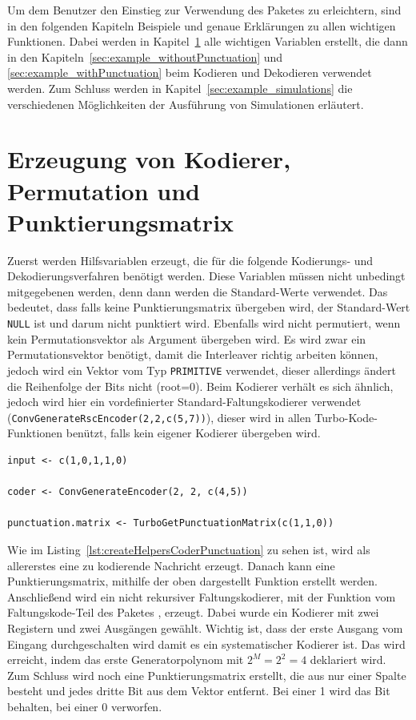 Um dem Benutzer den Einstieg zur Verwendung des Paketes zu erleichtern, sind in den folgenden Kapiteln Beispiele und genaue Erklärungen zu allen wichtigen Funktionen. Dabei werden in Kapitel~\ref{sec:example_createHelpers} alle wichtigen Variablen erstellt, die dann in den Kapiteln~\ref{sec:example_withoutPunctuation} und \ref{sec:example_withPunctuation} beim Kodieren und Dekodieren verwendet werden. Zum Schluss werden in Kapitel~\ref{sec:example_simulations} die verschiedenen Möglichkeiten der Ausführung von Simulationen erläutert.

\section{Erzeugung von Kodierer, Permutation und Punktierungsmatrix}
\label{sec:example_createHelpers}
Zuerst werden Hilfsvariablen erzeugt, die für die folgende Kodierungs- und Dekodierungsverfahren benötigt werden. Diese Variablen müssen nicht unbedingt mitgegebenen werden, denn dann werden die Standard-Werte verwendet. Das bedeutet, dass falls keine Punktierungsmatrix übergeben wird, der Standard-Wert \texttt{NULL} ist und darum nicht punktiert wird. Ebenfalls wird nicht permutiert, wenn kein Permutationsvektor als Argument übergeben wird. Es wird zwar ein Permutationsvektor benötigt, damit die Interleaver richtig arbeiten können, jedoch wird ein Vektor vom Typ \texttt{PRIMITIVE} verwendet, dieser allerdings ändert die Reihenfolge der Bits nicht (root=0). Beim Kodierer verhält es sich ähnlich, jedoch wird hier ein vordefinierter Standard-Faltungskodierer verwendet (\texttt{ConvGenerateRscEncoder(2,2,c(5,7))}), dieser wird in allen Turbo-Kode-Funktionen benützt, falls kein eigener Kodierer übergeben wird.

\begin{lstlisting}[caption=Erzeugung von Kodierer und Punktierungsmatrix, label={lst:createHelpersCoderPunctuation}, float=!th]
input <- c(1,0,1,1,0)

coder <- ConvGenerateEncoder(2, 2, c(4,5))

punctuation.matrix <- TurboGetPunctuationMatrix(c(1,1,0))
\end{lstlisting}

Wie im Listing~\ref{lst:createHelpersCoderPunctuation} zu sehen ist, wird als allererstes eine zu kodierende Nachricht erzeugt. Danach kann eine Punktierungsmatrix, mithilfe der oben dargestellt Funktion erstellt werden. Anschließend wird ein nicht rekursiver Faltungskodierer, mit der Funktion vom Faltungskode-Teil des Paketes \cite{nocker}, erzeugt. Dabei wurde ein Kodierer mit zwei Registern und zwei Ausgängen gewählt. Wichtig ist, dass der erste Ausgang vom Eingang durchgeschalten wird damit es ein systematischer Kodierer ist. Das wird erreicht, indem das erste Generatorpolynom mit $2^M = 2^2 = 4$ deklariert wird. Zum Schluss wird noch eine Punktierungsmatrix erstellt, die aus nur einer Spalte besteht und jedes dritte Bit aus dem Vektor entfernt. Bei einer 1 wird das Bit behalten, bei einer 0 verworfen.

